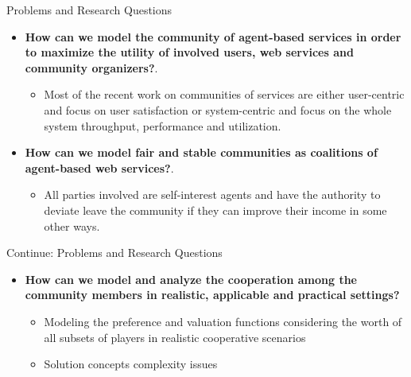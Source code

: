 \documentclass{beamer}
\begin{document}
\begin{frame}{Problems and Research Questions}

\begin{itemize}
    \item \textbf{How can we model the
        community of agent-based services in order to maximize the utility
        of involved users, web services and community organizers?}.
        \begin{itemize}
            \item Most of the recent work on communities of
            services are either user-centric and focus on user satisfaction
            or system-centric and focus on the whole system throughput, performance and utilization.
        \end{itemize}


    \item \textbf{How can we model fair and stable communities as coalitions
        of agent-based web services?}.
        \begin{itemize}
            \item All parties involved are self-interest agents and have the authority to deviate leave the community if they can improve their income in some other ways.
        \end{itemize}

\end{itemize}

\end{frame}

\begin{frame}{Continue: Problems and Research Questions}
 \begin{itemize}
   \item \textbf{How can we model and analyze the cooperation
        among the community members in realistic, applicable and practical
        settings?}
        \begin{itemize}
            \item Modeling the preference and valuation functions considering the worth of all subsets of players in realistic cooperative scenarios
            \item Solution concepts complexity issues
        \end{itemize}

\end{itemize}
\end{frame}
\end{document}
